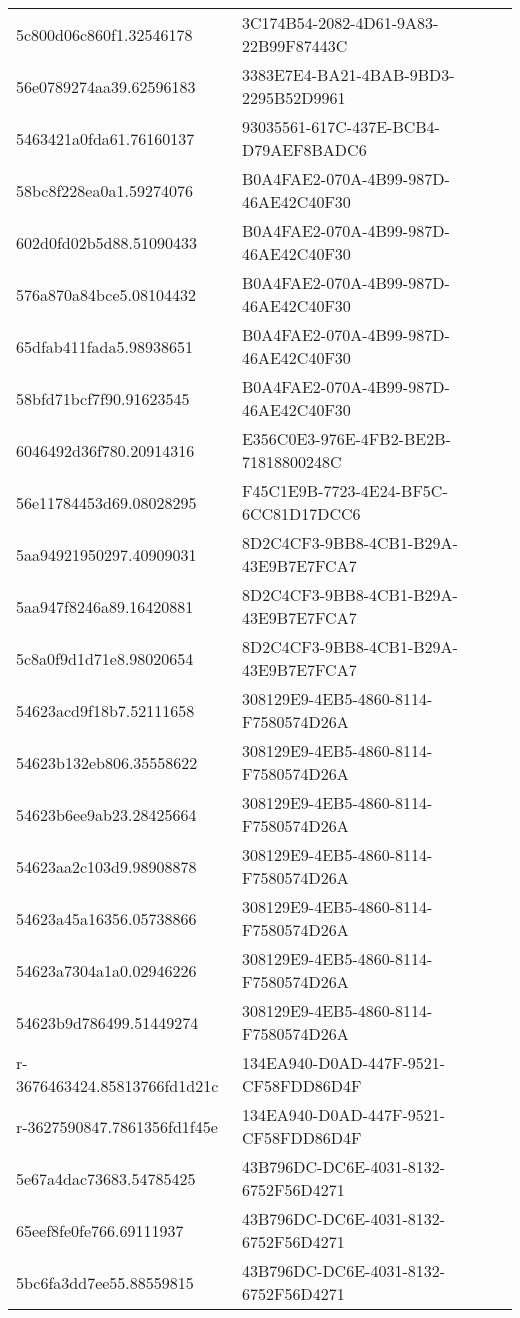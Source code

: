 \begin{tabular}{ll}
5c800d06c860f1.32546178 & 3C174B54-2082-4D61-9A83-22B99F87443C \\
56e0789274aa39.62596183 & 3383E7E4-BA21-4BAB-9BD3-2295B52D9961 \\
5463421a0fda61.76160137 & 93035561-617C-437E-BCB4-D79AEF8BADC6 \\
58bc8f228ea0a1.59274076 & B0A4FAE2-070A-4B99-987D-46AE42C40F30 \\
602d0fd02b5d88.51090433 & B0A4FAE2-070A-4B99-987D-46AE42C40F30 \\
576a870a84bce5.08104432 & B0A4FAE2-070A-4B99-987D-46AE42C40F30 \\
65dfab411fada5.98938651 & B0A4FAE2-070A-4B99-987D-46AE42C40F30 \\
58bfd71bcf7f90.91623545 & B0A4FAE2-070A-4B99-987D-46AE42C40F30 \\
6046492d36f780.20914316 & E356C0E3-976E-4FB2-BE2B-71818800248C \\
56e11784453d69.08028295 & F45C1E9B-7723-4E24-BF5C-6CC81D17DCC6 \\
5aa94921950297.40909031 & 8D2C4CF3-9BB8-4CB1-B29A-43E9B7E7FCA7 \\
5aa947f8246a89.16420881 & 8D2C4CF3-9BB8-4CB1-B29A-43E9B7E7FCA7 \\
5c8a0f9d1d71e8.98020654 & 8D2C4CF3-9BB8-4CB1-B29A-43E9B7E7FCA7 \\
54623acd9f18b7.52111658 & 308129E9-4EB5-4860-8114-F7580574D26A \\
54623b132eb806.35558622 & 308129E9-4EB5-4860-8114-F7580574D26A \\
54623b6ee9ab23.28425664 & 308129E9-4EB5-4860-8114-F7580574D26A \\
54623aa2c103d9.98908878 & 308129E9-4EB5-4860-8114-F7580574D26A \\
54623a45a16356.05738866 & 308129E9-4EB5-4860-8114-F7580574D26A \\
54623a7304a1a0.02946226 & 308129E9-4EB5-4860-8114-F7580574D26A \\
54623b9d786499.51449274 & 308129E9-4EB5-4860-8114-F7580574D26A \\
r-3676463424.85813766fd1d21c & 134EA940-D0AD-447F-9521-CF58FDD86D4F \\
r-3627590847.7861356fd1f45e & 134EA940-D0AD-447F-9521-CF58FDD86D4F \\
5e67a4dac73683.54785425 & 43B796DC-DC6E-4031-8132-6752F56D4271 \\
65eef8fe0fe766.69111937 & 43B796DC-DC6E-4031-8132-6752F56D4271 \\
5bc6fa3dd7ee55.88559815 & 43B796DC-DC6E-4031-8132-6752F56D4271 \\

\end{tabular}
